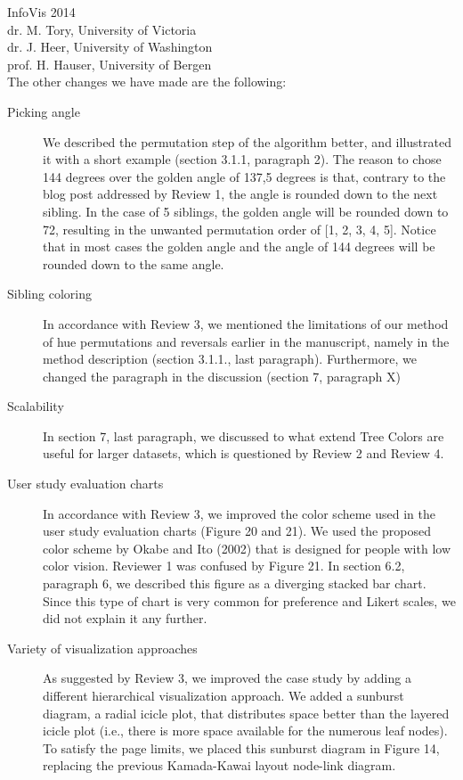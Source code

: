 \documentclass{letter}
\begin{document}
\begin{letter}{InfoVis 2014 \\ dr. M. Tory, University of Victoria \\ dr. J. Heer, University of Washington \\ prof. H. Hauser, University of Bergen}
\newpage
{} \\

The other changes we have made are the following:

\begin{description}
\item[Picking angle] We described the permutation step of the algorithm better, and illustrated it with a short example (section 3.1.1, paragraph 2). The reason to chose 144 degrees over the golden angle of 137,5 degrees is that, contrary to the blog post addressed by Review 1, the angle is rounded down to the next sibling. In the case of 5 siblings, the golden angle will be rounded down to 72, resulting in the unwanted permutation order of [1, 2, 3, 4, 5]. Notice that in most cases the golden angle and the angle of 144 degrees will be rounded down to the same angle.
\item[Sibling coloring] In accordance with Review 3, we mentioned the limitations of our method of hue permutations and reversals earlier in the manuscript, namely in the method description (section 3.1.1., last paragraph). Furthermore, we changed the paragraph in the discussion (section 7, paragraph X)
\item[Scalability] In section 7, last paragraph, we discussed to what extend Tree Colors are useful for larger datasets, which is questioned by Review 2 and Review 4.
\item[User study evaluation charts] In accordance with Review 3, we improved the color scheme used in the user study evaluation charts (Figure 20 and 21). We used the proposed color scheme by Okabe and Ito (2002) that is designed for people with low color vision. Reviewer 1 was confused by Figure 21. In section 6.2, paragraph 6, we described this figure as a diverging stacked bar chart. Since this type of chart is very common for preference and Likert scales, we did not explain it any further.
\item[Variety of visualization approaches] As suggested by Review 3, we improved the case study by adding a different hierarchical visualization approach. We added a sunburst diagram, a radial icicle plot, that distributes space better than the layered icicle plot (i.e., there is more space available for the numerous leaf nodes). To satisfy the page limits, we placed this sunburst diagram in Figure 14, replacing the previous Kamada-Kawai layout node-link diagram.
\end{description}


\end{letter}
\end{document}
